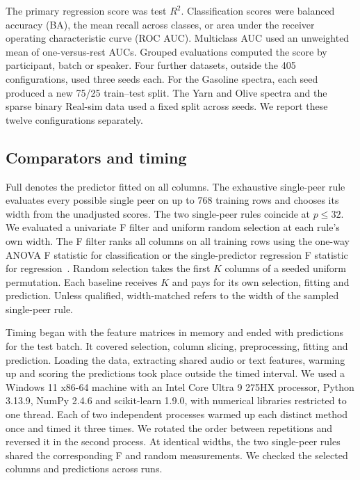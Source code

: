 \documentclass[11pt,a4paper]{article}
\begin{document}
The primary regression score was test $R^2$. Classification scores were balanced accuracy (BA), the mean recall across classes, or area under the receiver operating characteristic curve (ROC AUC). Multiclass AUC used an unweighted mean of one-versus-rest AUCs. Grouped evaluations computed the score by participant, batch or speaker. Four further datasets, outside the 405 configurations, used three seeds each. For the Gasoline spectra, each seed produced a new 75/25 train--test split. The Yarn and Olive spectra and the sparse binary Real-sim data used a fixed split across seeds. We report these twelve configurations separately.

\subsection{Comparators and timing}
Full denotes the predictor fitted on all columns. The exhaustive single-peer rule evaluates every possible single peer on up to 768 training rows and chooses its width from the unadjusted scores. The two single-peer rules coincide at $p\le32$. We evaluated a univariate F filter and uniform random selection at each rule's own width. The F filter ranks all columns on all training rows using the one-way ANOVA F statistic for classification or the single-predictor regression F statistic for regression~\cite{skf}. Random selection takes the first $K$ columns of a seeded uniform permutation. Each baseline receives $K$ and pays for its own selection, fitting and prediction. Unless qualified, width-matched refers to the width of the sampled single-peer rule.

Timing began with the feature matrices in memory and ended with predictions for the test batch. It covered selection, column slicing, preprocessing, fitting and prediction. Loading the data, extracting shared audio or text features, warming up and scoring the predictions took place outside the timed interval. We used a Windows 11 x86-64 machine with an Intel Core Ultra 9 275HX processor, Python 3.13.9, NumPy 2.4.6 and scikit-learn 1.9.0, with numerical libraries restricted to one thread. Each of two independent processes warmed up each distinct method once and timed it three times. We rotated the order between repetitions and reversed it in the second process. At identical widths, the two single-peer rules shared the corresponding F and random measurements. We checked the selected columns and predictions across runs.
\end{document}
